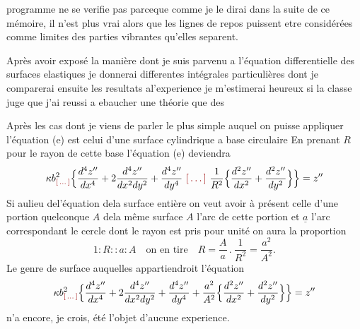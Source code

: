 \documentclass[11pt,a4paper]{article}
\begin{document}

programme  ne se verifie pas parceque comme je le dirai dans
la suite de ce mémoire, il n'est plus vrai alors que les lignes
de repos puissent etre considérées comme limites des parties vibrantes
qu'elles separent.

Après avoir exposé la manière dont je suis parvenu a l'équation
differentielle des surfaces elastiques je donnerai differentes intégrales particulières
dont je comparerai ensuite les resultats al'experience je m'estimerai
heureux si la classe juge que j'ai reussi a ebaucher une théorie
que des


Après les cas dont je viens de parler le plus simple auquel on puisse appliquer
l'équation (e) est celui d'une surface cylindrique a base circulaire
En prenant $R$ pour le rayon de cette base l'équation (e) deviendra
\[
\kappa b^{2}_{\ill{}}\Bigl\{\frac{d^4z''}{dx^4}+2\frac{d^4z''}{dx^2dy^2}+\frac{d^4z''}{dy^4}\ \ill{}\ \frac{1}{R^2}\Bigl\{\frac{d^2z''}{dx^2}+\frac{d^2z''}{dy^2}\Bigr\}\Bigr\}=z''
\]
Si aulieu del'équation dela surface entière on veut avoir à présent celle
d'une portion quelconque $A$ dela même surface   $A$
l'arc de cette portion et $\underline{a}$ l'arc correspondant  le cercle dont le rayon
est pris pour unité on aura la proportion
\[
1:R::a:A \quad\text{on en tire}\quad R=\frac{A}{a}\,.\ \frac{1}{R^2}=\frac{a^2}{A^2}.
\]
Le genre de surface auquelles appartiendroit l'équation
\[
\kappa b^{2}_{\ill{}}\Bigl\{\frac{d^4z''}{dx^4}+2\frac{d^4z''}{dx^2dy^2}+\frac{d^4z''}{dy^4}+\frac{a^2}{A^2}\Bigl\{\frac{d^2z''}{dx^2}+\frac{d^2z''}{dy^2}\Bigr\}\Bigr\}=z''
\]
n'a encore, je crois, été l'objet d'aucune experience.
\end{document}
